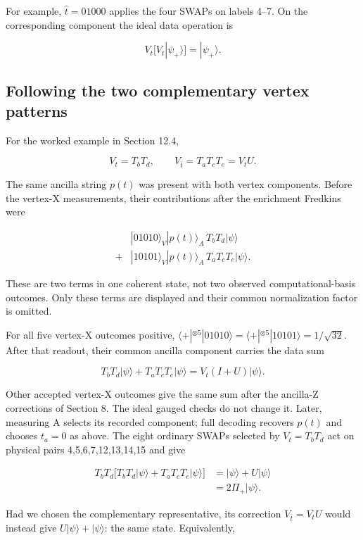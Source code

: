 \documentclass[11pt]{article}
\begin{document}
For example, \(\widehat t=01000\) applies the four SWAPs on labels 4--7. On the corresponding component the ideal data operation is

\[
V_t\bigl[V_t|\psi_+\rangle\bigr]=|\psi_+\rangle.
\]

\subsection{Following the two complementary vertex patterns}
For the worked example in Section 12.4,

\[
V_t=T_bT_d,\qquad V_{\bar t}=T_aT_cT_e=V_tU.
\]

The same ancilla string \(p(t)\) was present with both vertex components. Before the vertex-X measurements, their contributions after the enrichment Fredkins were

\[
\begin{aligned}
&|01010\rangle_V|p(t)\rangle_A\,T_bT_d|\psi\rangle\\
{}+{}&|10101\rangle_V|p(t)\rangle_A\,T_aT_cT_e|\psi\rangle.
\end{aligned}
\]

These are two terms in one coherent state, not two observed computational-basis outcomes. Only these terms are displayed and their common normalization factor is omitted.

For all five vertex-X outcomes positive, \(\langle+|^{\otimes5}|01010\rangle =\langle+|^{\otimes5}|10101\rangle=1/\sqrt{32}\). After that readout, their common ancilla component carries the data sum

\[
T_bT_d|\psi\rangle+T_aT_cT_e|\psi\rangle
=V_t(I+U)|\psi\rangle.
\]

Other accepted vertex-X outcomes give the same sum after the ancilla-Z corrections of Section 8. The ideal gauged checks do not change it. Later, measuring A selects its recorded component; full decoding recovers \(p(t)\) and chooses \(t_a=0\) as above. The eight ordinary SWAPs selected by \(V_t=T_bT_d\) act on physical pairs 4,5,6,7,12,13,14,15 and give

\[
\begin{aligned}
T_bT_d\bigl[T_bT_d|\psi\rangle+T_aT_cT_e|\psi\rangle\bigr]
&=|\psi\rangle+U|\psi\rangle\\
&=2\Pi_+|\psi\rangle.
\end{aligned}
\]

Had we chosen the complementary representative, its correction \(V_{\bar t}=V_tU\) would instead give \(U|\psi\rangle+|\psi\rangle\): the same state. Equivalently,
\end{document}
